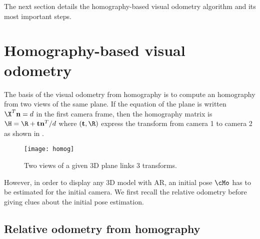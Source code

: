 \documentclass{ecnreport}
\begin{document}
The next section details the homography-based visual odometry algorithm and its most important steps.

\def\n{\mathbf{n}}
\def\t{\mathbf{t}}
\section{Homography-based visual odometry}

The basis of the visual odometry from homography is to compute an homography from two views of the same plane. 
If the equation of the plane is written $\X^T\n = d$ in the first camera frame, then the homography matrix is $\H = \R + \t\n^T/d$
where $(\t, \R)$ express the transform from camera 1 to camera 2 as shown in .


\begin{figure}[h!]
\centering\label{fig:homog}
 \texttt{[image: homog]}
 \caption{Two views of a given 3D plane links 3 transforms.}
\end{figure}
However, in order to display any 3D model with AR, an initial pose $\cMo$ has to be estimated for the initial camera. We first recall the relative
odometry before giving clues about the initial pose estimation.

\subsection{Relative odometry from homography}
\end{document}
